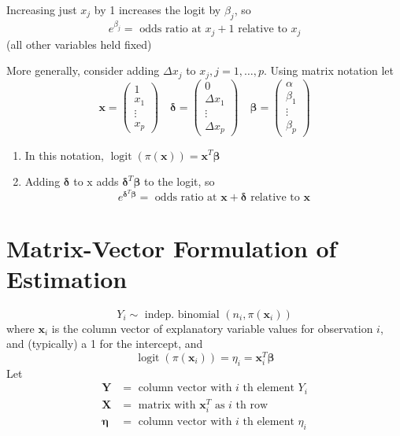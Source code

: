 \documentclass[11pt]{elegantbook}
\begin{document}
Increasing just $x_j$ by 1 increases the logit by $\beta_j$, so
$$
e^{\beta_j}=\text { odds ratio at } x_j+1 \text { relative to } x_j
$$
(all other variables held fixed)

More generally, consider adding $\Delta x_j$ to $x_j, j=1, \ldots, p$. Using matrix notation let
$$
\mathbf{x}=\left(\begin{array}{c}
1 \\
x_1 \\
\vdots \\
x_p
\end{array}\right) \quad \boldsymbol{\delta}=\left(\begin{array}{c}
0 \\
\Delta x_1 \\
\vdots \\
\Delta x_p
\end{array}\right) \quad \boldsymbol{\beta}=\left(\begin{array}{c}
\alpha \\
\beta_1 \\
\vdots \\
\beta_p
\end{array}\right)
$$
\begin{enumerate}[$\bullet$]
    \item In this notation, $\operatorname{logit}(\pi(\mathbf{x}))=\mathbf{x}^T \boldsymbol{\beta}$
    \item Adding $\boldsymbol{\delta}$ to $\mathrm{x}$ adds $\boldsymbol{\delta}^T \boldsymbol{\beta}$ to the logit, so
    $$
    e^{\boldsymbol{\delta}^T \boldsymbol{\beta}}=\text { odds ratio at } \mathbf{x}+\boldsymbol{\delta} \text { relative to } \mathbf{x}
    $$
\end{enumerate}

\section{Matrix-Vector Formulation of Estimation}
$$
Y_i \sim \text { indep. binomial }\left(n_i, \pi\left(\boldsymbol{x}_i\right)\right)
$$
where $\boldsymbol{x}_i$ is the column vector of explanatory variable values for observation $i$, and (typically) a 1 for the intercept, and
$$
\operatorname{logit}\left(\pi\left(\boldsymbol{x}_i\right)\right)=\eta_i=\boldsymbol{x}_i^T \boldsymbol{\beta}
$$
Let
$$
\begin{aligned}
\boldsymbol{Y} & =\text { column vector with } i \text { th element } Y_i \\
\boldsymbol{X} & =\text { matrix with } \boldsymbol{x}_i^T \text { as } i \text { th row } \\
\boldsymbol{\eta} & =\text { column vector with } i \text { th element } \eta_i
\end{aligned}
$$
\end{document}
